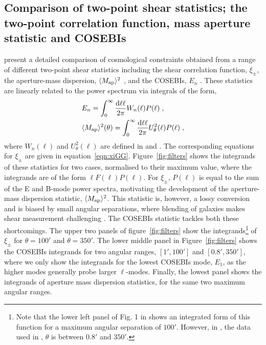\subsection{Comparison of two-point shear statistics; the two-point correlation function, mass aperture statistic and COSEBIs}
\citet{kilbinger/etal:2013} present a detailed comparison of cosmological constraints obtained from a range of different two-point shear statistics including the shear correlation function, $\xi_\pm$, the aperture-mass dispersion, $\langle M_ {\rm ap} \rangle ^2$ \citep{schneider/etal:1998}, and the COSEBIs, $E_n$ \citep{schneider/etal:2010}.  These statistics are linearly related to the power spectrum via integrals of the form,
%
\begin{align}
\label{eqn:integ}
& E_n =\int_0^{\infty}\frac{{\rm d} \ell \ell}{2\pi} W_n(\ell) P(\ell)\;,\\ \nonumber
& \langle M_ {\rm ap} \rangle ^2(\theta)=\int_0^{\infty}\frac{{\rm d} \ell \ell}{2\pi} U^2_\theta(\ell) P(\ell)\;,
\end{align}
%
where $W_n(\ell)$ and $U^2_\theta(\ell)$ are defined in \cite{schneider/etal:2010} and \cite{schneider/etal:1998}. The corresponding equations for $\xi_\pm$ are given in equation~\ref{eqn:xiGG}.
Figure~\ref{fig:filters} shows the integrands of these statistics 
for two cases, normalised to their maximum value, where the integrands are of the form $\ell F(\ell) P(\ell)$. For $\xi_\pm$, $P(\ell)$ is equal to the sum of the E and B-mode power spectra, motivating the development of the aperture-mass dispersion statistic, $\langle M_ {\rm ap} \rangle ^2$.  This statistic is, however, a lossy conversion and is biased by small angular separations, where blending of galaxies makes shear measurement challenging \citep{kilbinger/etal:2006}.  The COSEBIs statistic tackles both these shortcomings.  The upper two panels of figure~\ref{fig:filters} show the integrands\footnote{Note that the lower left panel of Fig. 1 in \citet{kitching/etal:2016} shows an integrated form of this function for a maximum angular separation of $100'$. However, in \citet{kilbinger/etal:2013}, the data used in \citet{kitching/etal:2016}, $\theta$ is between $0.8'$ and $350'$.} of $\xi_\pm$ for $\theta=100'$ and $\theta=350'$. The lower middle panel in Figure~\ref{fig:filters} shows the COSEBIs integrands for two angular ranges, $[1',100']$ and $[0.8',350']$, where we only show the integrands for the lowest COSEBIs mode, $E_1$, as the higher modes generally probe larger $\ell$-modes.  Finally, the lowest panel shows the integrands of aperture mass dispersion statistics, for the same two maximum angular ranges. 

